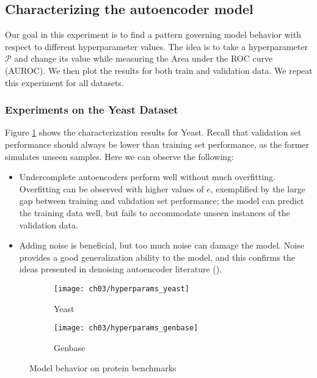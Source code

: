\subsection{Characterizing the autoencoder model}

Our goal in this experiment is to find a pattern governing model behavior
with respect to different hyperparameter values. The idea is to take a
hyperparameter $\mathcal{P}$ and change its value while measuring the Area
under the ROC curve (AUROC). We then plot the results for both train and
validation data. We repeat this experiment for all datasets.

\subsubsection{Experiments on the Yeast Dataset}

Figure \ref{results:sdae_char_yeast} shows the characterization results for
Yeast. Recall that validation set performance should always be lower than
training set performance, as the former simulates unseen samples. Here we can
observe the following:

\begin{itemize}
  \item Undercomplete autoencoders perform well without much overfitting.
      Overfitting can be observed with higher values of $e$, exemplified by the
      large gap between training and validation set performance; the model can
      predict the training data well, but fails to accommodate unseen instances
      of the validation data.
  \item Adding noise is beneficial, but too much noise can damage the model.
      Noise provides a good generalization ability to the model, and this
      confirms the ideas presented in denoising autoencoder literature
      (\cite{vincent2008denoising, vincent2010stacked}).
\end{itemize}
 
\begin{figure}[!t]
  \centering
  \begin{subfigure}[b]{0.48\textwidth}
    \texttt{[image: ch03/hyperparams\_yeast]}
    \caption{Yeast}
    \label{results:sdae_char_yeast}
  \end{subfigure}
  \begin{subfigure}[b]{0.48\textwidth}
    \texttt{[image: ch03/hyperparams\_genbase]}
    \caption{Genbase}
    \label{results:sdae_char_genbase}
  \end{subfigure}
  \caption{Model behavior on protein benchmarks}
  \label{results:sdae_char}
\end{figure}

